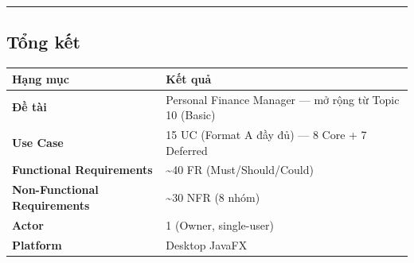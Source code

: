 \documentclass[11pt,a4paper]{article}
\newcounter{none}
\begin{document}
\clearpage
\begin{center}\rule{1.0\linewidth}{0.5pt}\end{center}

\subsection{Tổng kết}\label{tux1ed5ng-kux1ebft}

{\def\LTcaptype{none}
\begin{longtable}[]{@{}ll@{}}
\toprule\noalign{}
Hạng mục & Kết quả \\
\midrule\noalign{}
\endhead
\bottomrule\noalign{}
\endlastfoot
\textbf{Đề tài} & Personal Finance Manager --- mở rộng từ Topic 10 (Basic) \\ 
\textbf{Use Case} & 15 UC (Format A đầy đủ) --- 8 Core + 7 Deferred \\ 
\textbf{Functional Requirements} & \textasciitilde40 FR (Must/Should/Could) \\ 
\textbf{Non-Functional Requirements} & \textasciitilde30 NFR (8 nhóm) \\ 
\textbf{Actor} & 1 (Owner, single-user) \\ 
\textbf{Platform} & Desktop JavaFX \\
\end{longtable}
}
\end{document}
